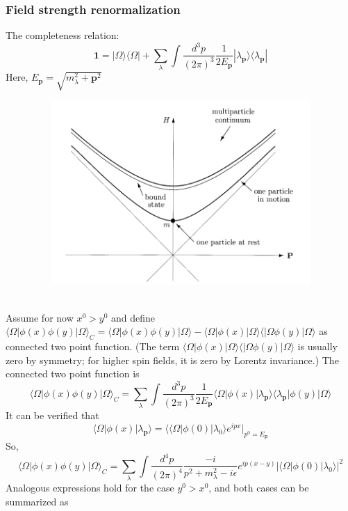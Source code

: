 \documentclass{article}
\begin{document}
\subsubsection{Field strength renormalization}
The completeness relation:
\[\mathbf{1} = |\Omega\rangle\langle\Omega| +  \sum_{\lambda} \int \frac{d^3p}{(2\pi)^3} \frac{1}{2E_{\mathbf{p}}} |\lambda_{\mathbf{p}}\rangle\langle\lambda_{\mathbf{p}}|\]
Here, $E_{\mathbf{p}} = \sqrt{m_{\lambda}^2 + \mathbf{p}^2}$\\
\begin{figure}[!h]
\centering
\includegraphics[height=7cm ,width=12cm]{./pic/FSR1.png}
\caption*{}
\end{figure}
\\
Assume for now $x^0 > y^0$ and define $\langle \Omega | \phi(x) \phi(y) | \Omega \rangle_{C} = \langle \Omega | \phi(x) \phi(y) | \Omega \rangle - \langle \Omega | \phi(x)| \Omega \rangle \langle | \Omega \phi(y) | \Omega \rangle$ as connected two point function. (The term $\langle \Omega | \phi(x)| \Omega \rangle \langle | \Omega \phi(y) | \Omega \rangle$ is usually zero by symmetry; for higher spin fields, it is zero by Lorentz invariance.) The connected two point function is
\[\langle \Omega | \phi(x) \phi(y) | \Omega \rangle_{C} = \sum_{\lambda} \int \frac{d^3p}{(2\pi)^3} \frac{1}{2E_{\mathbf{p}}} \langle \Omega | \phi(x) |\lambda_{\mathbf{p}}\rangle\langle\lambda_{\mathbf{p}}| \phi(y) | \Omega \rangle\]
It can be verified that
\[\langle \Omega | \phi(x) |\lambda_{\mathbf{p}}\rangle = \langle \langle \Omega | \phi(0) | \lambda_0 \rangle e^{ipx} |_{p^0 = E_{\mathbf{p}}}\]
So,
\[\langle \Omega | \phi(x) \phi(y) | \Omega \rangle_C = \sum_{\lambda} \int \frac{d^4p}{(2\pi)^4} \frac{-i}{p^2 + m_{\lambda}^2 -i\epsilon} e^{ip(x-y)} |\langle \Omega | \phi(0) | \lambda_0 \rangle|^2\]
Analogous expressions hold for the case $y^0 > x^0$, and both cases can be summarized as
\end{document}
